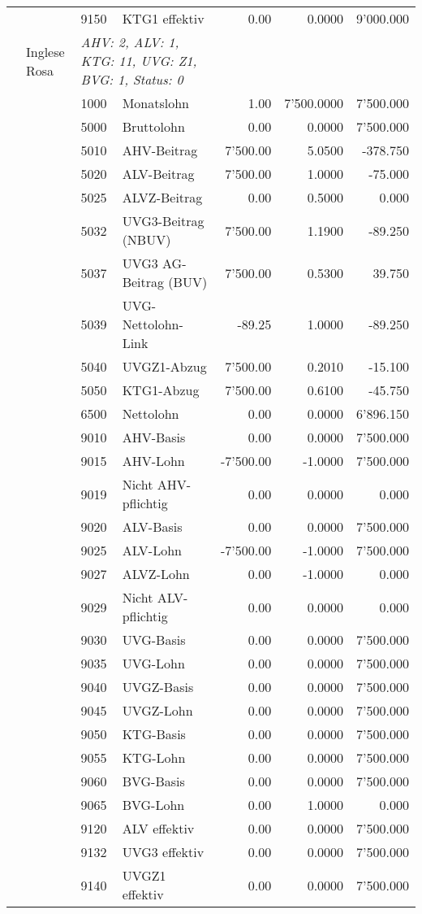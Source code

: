 \documentclass[15pt,a4paper]{article}
\begin{document}
\begin{longtable}{@{\extracolsep{\fill}}l l l l|r|r|r}
&&9150&KTG1 effektiv&0.00&0.0000&9'000.000\\
\pagebreak
12&Inglese Rosa&\multicolumn{2}{l|}{\small\emph{AHV: 2, ALV: 1, KTG: 11, UVG: Z1, BVG: 1, Status: 0}}&& \\
&&1000&Monatslohn&1.00&7'500.0000&7'500.000\\
&&5000&Bruttolohn&0.00&0.0000&7'500.000\\
&&5010&AHV-Beitrag&7'500.00&5.0500&-378.750\\
&&5020&ALV-Beitrag&7'500.00&1.0000&-75.000\\
&&5025&ALVZ-Beitrag&0.00&0.5000&0.000\\
&&5032&UVG3-Beitrag (NBUV)&7'500.00&1.1900&-89.250\\
&&5037&UVG3 AG-Beitrag (BUV)&7'500.00&0.5300&39.750\\
&&5039&UVG-Nettolohn-Link&-89.25&1.0000&-89.250\\
&&5040&UVGZ1-Abzug&7'500.00&0.2010&-15.100\\
&&5050&KTG1-Abzug&7'500.00&0.6100&-45.750\\
&&6500&Nettolohn&0.00&0.0000&6'896.150\\
&&9010&AHV-Basis&0.00&0.0000&7'500.000\\
&&9015&AHV-Lohn&-7'500.00&-1.0000&7'500.000\\
&&9019&Nicht AHV-pflichtig&0.00&0.0000&0.000\\
&&9020&ALV-Basis&0.00&0.0000&7'500.000\\
&&9025&ALV-Lohn&-7'500.00&-1.0000&7'500.000\\
&&9027&ALVZ-Lohn&0.00&-1.0000&0.000\\
&&9029&Nicht ALV-pflichtig&0.00&0.0000&0.000\\
&&9030&UVG-Basis&0.00&0.0000&7'500.000\\
&&9035&UVG-Lohn&0.00&0.0000&7'500.000\\
&&9040&UVGZ-Basis&0.00&0.0000&7'500.000\\
&&9045&UVGZ-Lohn&0.00&0.0000&7'500.000\\
&&9050&KTG-Basis&0.00&0.0000&7'500.000\\
&&9055&KTG-Lohn&0.00&0.0000&7'500.000\\
&&9060&BVG-Basis&0.00&0.0000&7'500.000\\
&&9065&BVG-Lohn&0.00&1.0000&0.000\\
&&9120&ALV effektiv&0.00&0.0000&7'500.000\\
&&9132&UVG3 effektiv&0.00&0.0000&7'500.000\\
&&9140&UVGZ1 effektiv&0.00&0.0000&7'500.000\\

\end{longtable}
\end{document}
